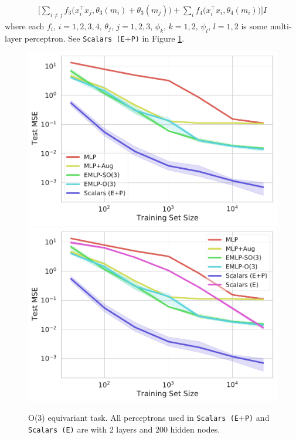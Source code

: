 \documentclass{article}
\begin{document}
\begin{align}
    \Big[\sum_{i\neq j} f_3\big(x_i^\top x_j, \theta_3(m_i)+\theta_3(m_j)\big) + \sum_{i} f_4\big(x_i^\top x_i, \theta_4(m_i)\big)\Big] I
\end{align}
where each $f_i$, $i=1,2,3,4$, $\theta_j$, $j=1,2,3$, $\phi_k$, $k=1,2$, $\psi_l$, $l=1,2$ is some multi-layer perceptron. See \texttt{Scalars (E$+$P)} in Figure \ref{fig:O3equivariant}.
\begin{figure}[H]
   \centering
   \includegraphics[scale=0.45]{data_efficiency_Inertia.pdf}
   \includegraphics[scale=0.45]{data_efficiency_Inertia_noperm.pdf}
   \caption{O(3) equivariant task. All perceptrons used in \texttt{Scalars (E$+$P)} and \texttt{Scalars (E)} are with 2 layers and 200 hidden nodes. }
   \label{fig:O3equivariant}
\end{figure}
\end{document}
